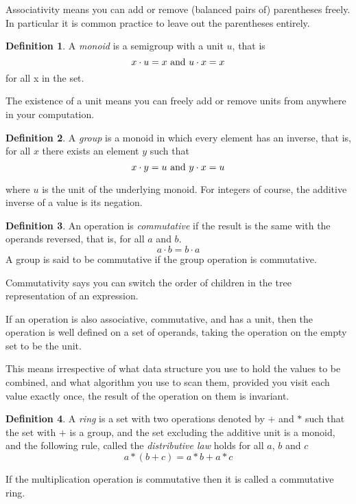 \documentclass[oneside]{book}
\theoremstyle{plain}
\theoremstyle{definition}
\newtheorem{definition}{Definition}
\theoremstyle{plain}
\begin{document}
Associativity means you can add or remove (balanced pairs of) parentheses freely.
In particular it is common practice to leave out the parentheses entirely.

\begin{definition}
A {\em monoid} is a semigroup with a unit $u$, that is
$$x\cdot u = x {\rm \ and\ }u \cdot x = x$$
for all x in the set.
\end{definition}

The existence of a unit means you can freely add or remove units from
anywhere in your computation.

\begin{definition}
A {\em group} is a monoid in which every element has an inverse, that is,
for all $x$ there exists an element $y$ such that
$$x \cdot y = u {\rm\ and\ } y \cdot x = u $$
\end{definition}
where $u$ is the unit of the underlying monoid. For integers of course,
the additive inverse of a value is its negation.

\begin{definition}
An operation is {\em commutative} if the result is the same with the operands
reversed, that is, for all $a$ and $b$.
$$a \cdot b = b \cdot a$$
A group is said to be commutative if the group operation is commutative.
\end{definition}

Commutativity says you can switch the order of children in the tree representation
of an expression.

If an operation is also associative, commutative, and has a unit, then the operation
is well defined on a set of operands, taking the operation on the empty
set to be the unit. 

This means irrespective of what data structure you use to hold the
values to be combined, and what algorithm you use to scan them,
provided you visit each value exactly once, the result of the
operation on them is invariant.

\begin{definition}
A {\em ring} is a set with two operations denoted by $+$ and $*$ such
that the set with $+$ is a group, and the set excluding the additive
unit is a monoid, and the following rule, called the
{\em distributive law} holds for all $a$, $b$ and $c$
$$a * (b + c)  = a * b + a * c$$

If the multiplication operation is commutative then it is called
a commutative ring.
\end{definition}
\end{document}
